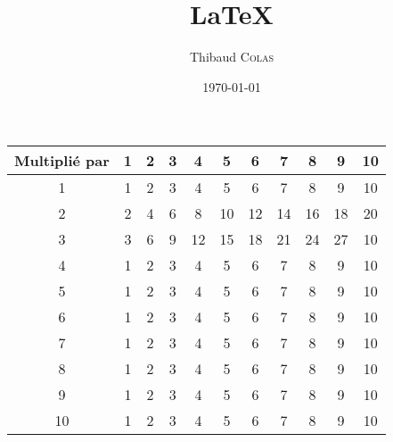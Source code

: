 \documentclass{article}
\author{Thibaud \textsc{Colas}}
\date{\today}
\title{\LaTeX}
\begin{document}
\maketitle

\begin{tabular}{|c|c|c|c|c|c|c|c|c|c|c|}

\hline
Multiplié par & 1 & 2 & 3 & 4 & 5 & 6 & 7 & 8 & 9 & 10 \\
\hline
1 & 1 & 2 & 3 & 4 & 5 & 6 & 7 & 8 & 9 & 10 \\
\hline
2 & 2 & 4 & 6 & 8 & 10 & 12 & 14 & 16 & 18 & 20 \\
\hline
3 & 3 & 6 & 9 & 12 & 15 & 18 & 21 & 24 & 27 & 10 \\
\hline
4 & 1 & 2 & 3 & 4 & 5 & 6 & 7 & 8 & 9 & 10 \\
\hline
5 & 1 & 2 & 3 & 4 & 5 & 6 & 7 & 8 & 9 & 10 \\
\hline
6 & 1 & 2 & 3 & 4 & 5 & 6 & 7 & 8 & 9 & 10 \\
\hline
7 & 1 & 2 & 3 & 4 & 5 & 6 & 7 & 8 & 9 & 10 \\
\hline
8 & 1 & 2 & 3 & 4 & 5 & 6 & 7 & 8 & 9 & 10 \\
\hline
9 & 1 & 2 & 3 & 4 & 5 & 6 & 7 & 8 & 9 & 10 \\
\hline
10 & 1 & 2 & 3 & 4 & 5 & 6 & 7 & 8 & 9 & 10 \\
\hline

\end{tabular}
\end{document}
